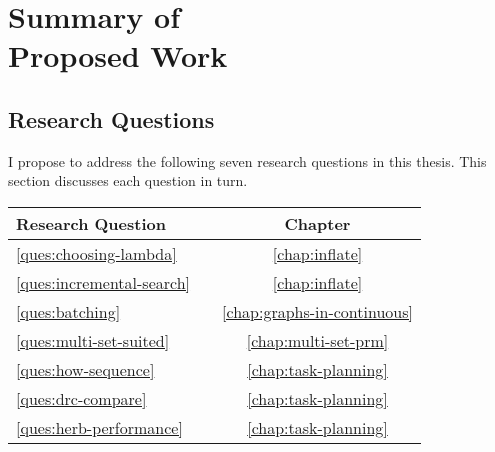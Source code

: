 \chapter[Summary of Proposed Work]{Summary of\\Proposed Work}
\label{chap:proposed}

\section{Research Questions}
\label{sec:research-questions}

I propose to address the following seven research questions
in this thesis.
This section discusses each question in turn.

\begin{center}
\begin{tabular}{llc}
\toprule
   \multicolumn{2}{l}{Research Question}
      & Chapter \\
\midrule
   \ref{ques:choosing-lambda}
      &
      \begin{minipage}[c]{0.75\columnwidth}%
      \nameref{ques:choosing-lambda}
      \end{minipage}%
      & \ref{chap:inflate} \\[12pt]
   \ref{ques:incremental-search}
      &
      \begin{minipage}[c]{0.75\columnwidth}%
      \nameref{ques:incremental-search}
      \end{minipage}%
      & \ref{chap:inflate} \\[12pt]
   \ref{ques:batching}
      &
      \begin{minipage}[c]{0.75\columnwidth}%
      \nameref{ques:batching}
      \end{minipage}%
      & \ref{chap:graphs-in-continuous} \\[12pt]
   \ref{ques:multi-set-suited}
      &
      \begin{minipage}[c]{0.75\columnwidth}%
      \nameref{ques:multi-set-suited}
      \end{minipage}%
      & \ref{chap:multi-set-prm} \\[12pt]
   \ref{ques:how-sequence}
      &
      \begin{minipage}[c]{0.75\columnwidth}%
      \nameref{ques:how-sequence}
      \end{minipage}%
      & \ref{chap:task-planning} \\[12pt]
   \ref{ques:drc-compare}
      &
      \begin{minipage}[c]{0.75\columnwidth}%
      \nameref{ques:drc-compare}
      \end{minipage}%
      & \ref{chap:task-planning} \\[12pt]
   \ref{ques:herb-performance}
      &
      \begin{minipage}[c]{0.75\columnwidth}%
      \nameref{ques:herb-performance}
      \end{minipage}%
      & \ref{chap:task-planning} \\[6pt]
\bottomrule
\end{tabular}
\end{center}

